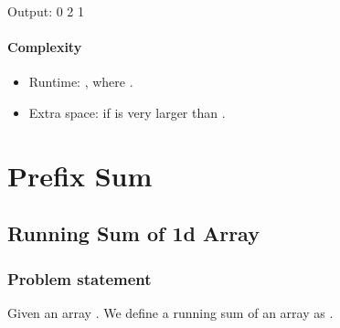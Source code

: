 \documentclass[letterpaper,12pt,english]{book}
\begin{document}
\begin{sphinxVerbatim}[commandchars=\\\{\}]
Output:
0
2
\PYGZhy{}1
\end{sphinxVerbatim}


\subsubsection{Complexity}
\label{\detokenize{Counting/387_First_Unique_Character_in_a_String:id2}}\begin{itemize}
\item {} 
\sphinxAtStartPar
Runtime: , where .

\item {} 
\sphinxAtStartPar
Extra space:  if  is very larger than .

\end{itemize}

\sphinxstepscope


\chapter{Prefix Sum}
\label{\detokenize{Prefix_Sum/index:prefix-sum}}\label{\detokenize{Prefix_Sum/index::doc}}
\sphinxstepscope


\section{Running Sum of 1d Array}
\label{\detokenize{Prefix_Sum/1480_Running_Sum_of_1d_Array:running-sum-of-1d-array}}\label{\detokenize{Prefix_Sum/1480_Running_Sum_of_1d_Array::doc}}

\subsection{Problem statement\sphinxfootnotemark[103]}
\label{\detokenize{Prefix_Sum/1480_Running_Sum_of_1d_Array:problem-statement}}%
\begin{footnotetext}[103]\sphinxAtStartFootnote
{}
%
\end{footnotetext}\ignorespaces 
\sphinxAtStartPar
Given an array . We define a running sum of an array as .
\end{document}
